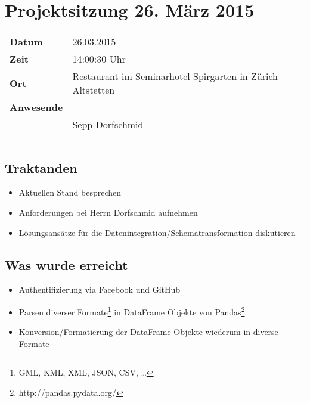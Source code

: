 \documentclass[class=scrbook,crop=false]{standalone}
\begin{document}
	
	\section{Projektsitzung 26. März 2015}
	
	\begin{tabular}{ll}
		\textbf{Datum} & 26.03.2015 \\
		\textbf{Zeit} & 14:00\textendash15:30 Uhr \\
		\textbf{Ort} & Restaurant im Seminarhotel Spirgarten in Zürich Altstetten \\
		\textbf{Anwesende} & \proff \\ & Sepp Dorfschmid\footnotemark{} \\ & \rlif \\ & \fscf
	\end{tabular}
	
	\subsection*{Traktanden}
	\begin{itemize}
		\item Aktuellen Stand besprechen
		\item Anforderungen bei Herrn Dorfschmid aufnehmen
		\item Lösungsansätze für die Datenintegration/Schematransformation diskutieren
	\end{itemize}
	
	\subsection*{Was wurde erreicht}
	\begin{itemize}
		\item Authentifizierung via Facebook und GitHub
		\item Parsen diverser Formate\footnote{GML, KML, XML, JSON, CSV, \dots} in DataFrame Objekte von Pandas\footnote{http://pandas.pydata.org/}
		\item Konversion/Formatierung der DataFrame Objekte wiederum in diverse Formate
	\end{itemize}
	
\end{document}

